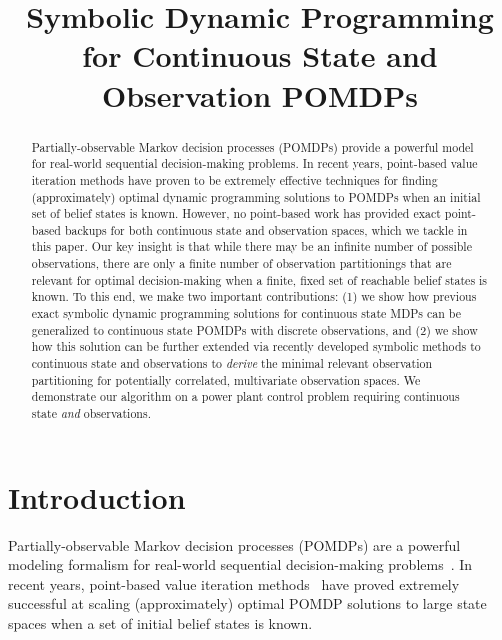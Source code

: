 \documentclass{article} %
\title{Symbolic Dynamic Programming for Continuous State and Observation POMDPs}
\author{
}
\begin{document}
\maketitle

\begin{abstract}
Partially-observable Markov decision processes (POMDPs) provide a
powerful model for real-world sequential decision-making problems.  In
recent years, point-based value iteration methods have proven to be
extremely effective techniques for finding (approximately) optimal
dynamic programming solutions to POMDPs when an initial set of belief
states is known.  However, no point-based work has provided exact
point-based backups for both continuous state and observation spaces,
which we tackle in this paper.  Our key insight is that while there
may be an infinite number of possible observations, there are only a
finite number of observation partitionings that are relevant for
optimal decision-making when a finite, fixed set of reachable belief
states is known.  To this end, we make two important contributions:
(1) we show how previous exact symbolic dynamic programming solutions
for continuous state MDPs can be generalized to continuous state
POMDPs with discrete observations, and (2) we show how this solution
can be further extended via recently developed symbolic methods to
continuous state and observations to \emph{derive} the minimal
relevant observation partitioning for potentially correlated,
multivariate observation spaces.
We demonstrate our algorithm on a power plant
control problem requiring continuous state 
\emph{and} observations.
\end{abstract}

\section{Introduction} %

Partially-observable Markov decision processes (POMDPs) are a powerful
modeling formalism for real-world sequential decision-making
problems~\cite{kaebling}.  In recent years, point-based value
iteration methods~\cite{pbvi_jair06,hsvi2,Perseus,gapmin} have proved
extremely successful at scaling (approximately) optimal POMDP
solutions to large state spaces when a set of initial belief states is
known.
\end{document}

